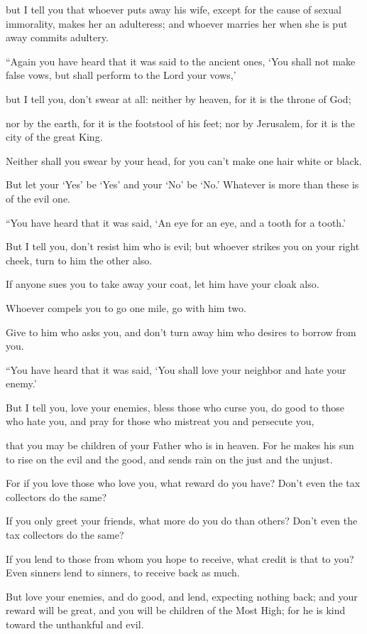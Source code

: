 but I tell you that whoever puts away his wife, except for the cause of sexual immorality, makes her an adulteress; and whoever marries her when she is put away commits adultery.

“Again you have heard that it was said to the ancient ones, ‘You shall not make false vows, but shall perform to the Lord your vows,’

but I tell you, don’t swear at all: neither by heaven, for it is the throne of God;

nor by the earth, for it is the footstool of his feet; nor by Jerusalem, for it is the city of the great King.

Neither shall you swear by your head, for you can’t make one hair white or black.

But let your ‘Yes’ be ‘Yes’ and your ‘No’ be ‘No.’ Whatever is more than these is of the evil one.

“You have heard that it was said, ‘An eye for an eye, and a tooth for a tooth.’

But I tell you, don’t resist him who is evil; but whoever strikes you on your right cheek, turn to him the other also.

If anyone sues you to take away your coat, let him have your cloak also.

Whoever compels you to go one mile, go with him two.

Give to him who asks you, and don’t turn away him who desires to borrow from you.

“You have heard that it was said, ‘You shall love your neighbor  and hate your enemy.’

But I tell you, love your enemies, bless those who curse you, do good to those who hate you, and pray for those who mistreat you and persecute you,

that you may be children of your Father who is in heaven. For he makes his sun to rise on the evil and the good, and sends rain on the just and the unjust.

For if you love those who love you, what reward do you have? Don’t even the tax collectors do the same?

If you only greet your friends, what more do you do than others? Don’t even the tax collectors do the same?


If you lend to those from whom you hope to receive, what credit is that to you? Even sinners lend to sinners, to receive back as much.

But love your enemies, and do good, and lend, expecting nothing back; and your reward will be great, and you will be children of the Most High; for he is kind toward the unthankful and evil.

